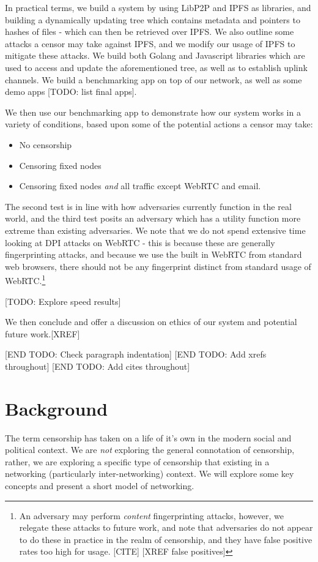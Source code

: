 \documentclass[12pt]{report}
\begin{document}
In practical terms, we build a system by using LibP2P and IPFS as libraries, and building a dynamically updating tree which contains metadata and pointers to hashes of files - which can then be retrieved over IPFS. We also outline some attacks a censor may take against IPFS, and we modify our usage of IPFS to mitigate these attacks. We build both Golang and Javascript libraries which are used to access and update the aforementioned tree, as well as to establish uplink channels. We build a benchmarking app on top of our network, as well as some demo apps [TODO: list final apps].

We then use our benchmarking app to demonstrate how our system works in a variety of conditions, based upon some of the potential actions a censor may take:
\begin{itemize}
  \item No censorship
  \item Censoring fixed nodes
  \item Censoring fixed nodes \emph{and} all traffic except WebRTC and email.
\end{itemize}

The second test is in line with how adversaries currently function in the real world, and the third test posits an adversary which has a utility function more extreme than existing adversaries. We note that we do not spend extensive time looking at DPI attacks on WebRTC - this is because these are generally fingerprinting attacks, and because we use the built in WebRTC from standard web browsers, there should not be any fingerprint distinct from standard usage of WebRTC.\footnote{An adversary may perform \emph{content} fingerprinting attacks, however, we relegate these attacks to future work, and note that adversaries do not appear to do these in practice in the realm of censorship, and they have false positive rates too high for usage. [CITE] [XREF false positives]}

[TODO: Explore speed results]

We then conclude and offer a discussion on ethics of our system and potential future work.[XREF]

[END TODO: Check paragraph indentation]
[END TODO: Add xrefs throughout]
[END TODO: Add cites throughout]

\chapter{Background}

The term censorship has taken on a life of it's own in the modern social and political context. We are \emph{not} exploring the general connotation of censorship, rather, we are exploring a specific type of censorship that existing in a networking (particularly inter-networking) context. We will explore some key concepts and present a short model of networking.
\end{document}
